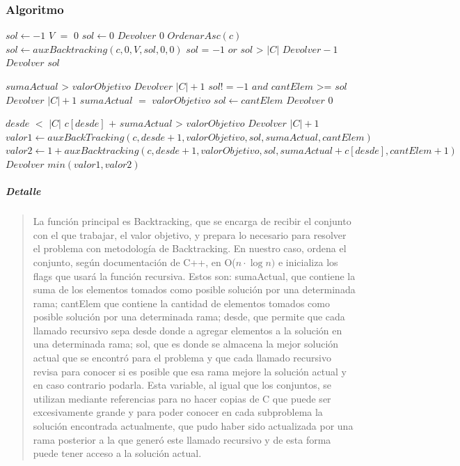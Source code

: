 \documentclass[8pt,a4paper]{article}
\begin{document}
\subsubsection{Algoritmo}



\begin{codebox}
  \li $sol \gets -1$ \li 
  \If $V$ $=$ $0$ \Then \li 
  	$sol \gets 0 $ \li 
  	$Devolver$ $0$
  \End 
  \li $OrdenarAsc(c)$
  $sol \gets auxBacktracking(c,0,V,sol,0,0)$
\li \If $sol$ = $-1$ $or$ $sol$ > $|C|$ \Then
\li 	$Devolver -1$\li 
\Else \li 
		$Devolver$ $sol$
	\End
  	\End
\end{codebox}

\begin{codebox}
\li 	\If $sumaActual$ > $valorObjetivo$ \Then 
		\li $Devolver$ $|C|+1$ 
		\End
	\li \If $sol!=-1$ $and$ $cantElem$ >= $sol$ \Then
		\li $Devolver$ $|C|+1$
  		\End
  	\li \If $sumaActual$ $=$ $valorObjetivo$ \Then
  	\li $sol \gets cantElem$
  	\li $Devolver$ $0$ 
  	\End
  	
  	\li \If $desde$ $<$ $|C|$ \Then
  	\li \If $c[desde]$ $+$ $sumaActual$ > $valorObjetivo$ \Then
  	\li $Devolver$ $|C|+1$ \li
  	\Else \li$valor1 \gets auxBackTracking(c,desde+1,valorObjetivo,sol,sumaActual,cantElem)$
  	\li $valor2 \gets 1+auxBacktracking(c,desde+1,valorObjetivo,sol,sumaActual+c[desde],cantElem+1)$
  	\li $Devolver$ $min(valor1,valor2)$
  	\End
\end{codebox}

\subparagraph{Detalle} 

\begin{verse}
La función principal es Backtracking, que se encarga de recibir el conjunto con el que trabajar, el valor objetivo, y prepara lo necesario para resolver el problema con metodología de Backtracking. En nuestro caso, ordena el conjunto, según documentación de C++, en O($ n \cdot \log{n})$ e inicializa los flags que usará la función recursiva. Estos son: sumaActual, que contiene la suma de los elementos tomados como posible solución por una determinada rama; cantElem que contiene la cantidad de elementos tomados como posible solución por una determinada rama; desde, que permite que cada llamado recursivo sepa desde donde a agregar elementos a la solución en una determinada rama; sol, que es donde se almacena la mejor solución actual que se encontró para el problema y que cada llamado recursivo revisa para conocer si es posible que esa rama mejore la solución actual y en caso contrario podarla. Esta variable, al igual que los conjuntos, se utilizan mediante referencias para no hacer copias de C que puede ser excesivamente grande y para poder conocer en cada subproblema la solución encontrada actualmente, que pudo haber sido actualizada por una rama posterior a la que generó este llamado recursivo y de esta forma puede tener acceso a la solución actual.
\end{verse}
\end{document}
